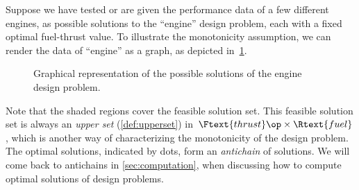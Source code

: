 \begin{example}
  Suppose we have tested or are given the performance data of a few different engines, as possible solutions to the ``engine'' design problem, each with a fixed optimal fuel-thrust value. To illustrate the monotonicity assumption, we can render the data of ``engine'' as a graph, as depicted in~\cref{fig:solenginedp}.
  \begin{figure}[h!]
    \begin{center}
    \end{center}
    \caption{Graphical representation of the possible solutions of the engine design problem. \label{fig:solenginedp}}
  \end{figure}

  Note that the shaded regions cover the feasible solution set. This feasible solution set is always an \emph{upper set} (\cref{def:upperset}) in~$\Ftext{thrust}\op \times \Rtext{fuel}$, which is another way of characterizing the monotonicity of the design problem. The optimal solutions, indicated by dots, form an \emph{antichain} of solutions. We will come back to antichains in \cref{sec:computation}, when discussing how to compute optimal solutions of design problems.
\end{example}


